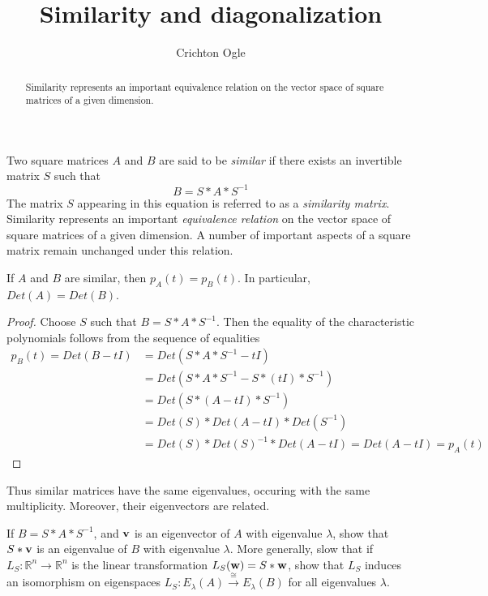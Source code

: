 \documentclass{ximera}
\title{Similarity and diagonalization}
\author{Crichton Ogle}
\begin{document}
\begin{abstract}
  Similarity represents an important equivalence relation on the vector space of square matrices of a given dimension.
\end{abstract}
\maketitle

Two square matrices $A$ and $B$ are said to be {\it similar} if there exists an invertible matrix $S$ such that
\[
B = S*A*S^{-1}
\]
The matrix $S$ appearing in this equation is referred to as a {\it similarity matrix}. Similarity represents an important {\it equivalence relation} on the vector space of square matrices of a given dimension. A number of important aspects of a square matrix remain unchanged under this relation.

\begin{lemma} If $A$ and $B$ are similar, then $p_A(t) = p_B(t)$. In particular, $Det(A) = Det(B)$.
\end{lemma}

\begin{proof} Choose $S$ such that $B = S*A*S^{-1}$. Then the equality of the characteristic polynomials follows from the sequence of equalities
\[
\begin{split}
p_B(t) = Det(B - tI) &= Det(S*A*S^{-1} - tI)\\
&= Det(S*A*S^{-1} - S*(tI)*S^{-1})\\
&= Det(S*(A - tI)*S^{-1})\\
&= Det(S)*Det(A - tI)*Det(S^{-1})\\
&= Det(S)*Det(S)^{-1}*Det(A - tI) = Det(A - tI) = p_A(t)
\end{split}
\]
\end{proof}

Thus similar matrices have the same eigenvalues, occuring with the same multiplicity. Moreover, their eigenvectors are related.

\begin{exercise} If $B = S*A*S^{-1}$, and ${\bf v}$ is an eigenvector of $A$ with eigenvalue $\lambda$, show that $S*{\bf v}$ is an eigenvalue of $B$ with eigenvalue $\lambda$. More generally, slow that if $L_S:\mathbb R^n\to \mathbb R^n$ is the linear transformation $L_S({\bf w}) = S*{\bf w}$, show that $L_S$ induces an isomorphism on eigenspaces $L_S:E_{\lambda}(A)\xrightarrow{\cong} E_{\lambda}(B)$ for all eigenvalues $\lambda$.
\end{exercise}
\end{document}
